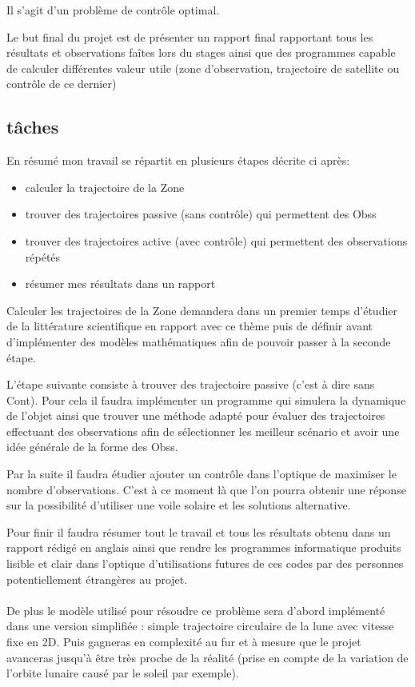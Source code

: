 \documentclass{article} %
\begin{document}
		Il s'agit d'un problème de contrôle optimal.
		
		Le but final du projet est de présenter un rapport final rapportant tous les résultats et observations faîtes lors du stages ainsi que des programmes capable de calculer différentes valeur utile (zone d'observation, trajectoire de satellite ou contrôle de ce dernier)
		
		\subsection{tâches}
		En résumé mon travail se répartit en plusieurs étapes décrite ci après:
		\begin{itemize}
			\item calculer la trajectoire de la \gls{Zone}
			\item trouver des trajectoires passive (sans contrôle) qui permettent des \glspl{Obs}
			\item trouver des trajectoires active (avec contrôle) qui permettent des observations répétés 
			\item résumer mes résultats dans un rapport
		\end{itemize}
		
		Calculer les trajectoires de la \gls{Zone} demandera dans un premier temps d'étudier de la littérature scientifique en rapport avec ce thème puis de définir avant d'implémenter des modèles mathématiques afin de pouvoir passer à la seconde étape.
		
		L'étape suivante consiste à trouver des trajectoire passive (c'est à dire sans \gls{Cont}). Pour cela il faudra implémenter un programme qui simulera la dynamique de l'objet ainsi que trouver une méthode adapté pour évaluer des trajectoires effectuant des observations afin de sélectionner les meilleur scénario et avoir une idée générale de la forme des \glspl{Obs}.
		
		Par la suite il faudra étudier ajouter un contrôle dans l'optique de maximiser le nombre d'observations. C'est à ce moment là que l'on pourra obtenir une réponse sur la possibilité d'utiliser une voile solaire et les solutions alternative.
		
		Pour finir il faudra résumer tout le travail et tous les résultats obtenu dans un rapport rédigé en anglais ainsi que rendre les programmes informatique produits lisible et clair dans l'optique d'utilisations futures de ces codes par des personnes potentiellement étrangères au projet.
		\\ \\
		De plus le modèle utilisé pour résoudre ce problème sera d'abord implémenté dans une version simplifiée : simple trajectoire circulaire de la lune avec vitesse fixe en 2D. Puis gagneras en complexité au fur et à mesure que le projet avanceras jusqu'à être très proche de la réalité (prise en compte de la variation de l'orbite lunaire causé par le soleil par exemple).
		
\end{document}
